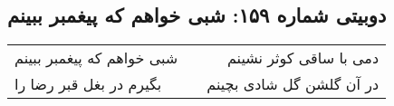 \begin{center}
\section*{دوبیتی شماره ۱۵۹: شبی خواهم که پیغمبر ببینم}
\label{sec:159}
\begin{longtable}{l p{0.5cm} r}
شبی خواهم که پیغمبر ببینم
&&
دمی با ساقی کوثر نشینم
\\
بگیرم در بغل قبر رضا را
&&
در آن گلشن گل شادی بچینم
\\
\end{longtable}
\end{center}
